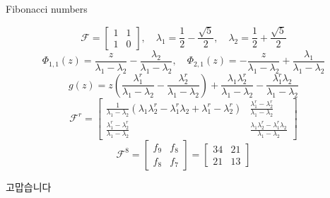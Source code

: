 \documentclass{beamer}
\begin{document}
\begin{frame}{Fibonacci numbers}

\begin{displaymath}
\mathcal{F} = \left[\begin{matrix}1 & 1\\1 & 0\end{matrix}\right],
\quad  \lambda_{1} =  \frac{1}{2}- \frac{\sqrt{5}}{2} ,
\quad \lambda_{2} = \frac{1}{2} + \frac{\sqrt{5}}{2}
\end{displaymath}
\vfill
\begin{displaymath}
 \Phi_{ 1, 1 }{\left (z \right )} = \frac{z}{\lambda_{1} - \lambda_{2}} - \frac{\lambda_{2}}{\lambda_{1} - \lambda_{2}}, \quad  \Phi_{ 2, 1 }{\left (z \right )} = - \frac{z}{\lambda_{1} - \lambda_{2}} + \frac{\lambda_{1}}{\lambda_{1} - \lambda_{2}}
\end{displaymath}
\vfill
\begin{displaymath}
g{\left (z \right )} = z \left(\frac{\lambda_{1}^{r}}{\lambda_{1} - \lambda_{2}} - \frac{\lambda_{2}^{r}}{\lambda_{1} - \lambda_{2}}\right) + \frac{\lambda_{1} \lambda_{2}^{r}}{\lambda_{1} - \lambda_{2}} - \frac{\lambda_{1}^{r} \lambda_{2}}{\lambda_{1} - \lambda_{2}}
\end{displaymath}
\vfill
\begin{displaymath}
\mathcal{F}^{r}=\left[\begin{matrix}\frac{1}{\lambda_{1} - \lambda_{2}} \left(\lambda_{1} \lambda_{2}^{r} - \lambda_{1}^{r} \lambda_{2} + \lambda_{1}^{r} - \lambda_{2}^{r}\right) & \frac{\lambda_{1}^{r} - \lambda_{2}^{r}}{\lambda_{1} - \lambda_{2}}\\\frac{\lambda_{1}^{r} - \lambda_{2}^{r}}{\lambda_{1} - \lambda_{2}} & \frac{\lambda_{1} \lambda_{2}^{r} - \lambda_{1}^{r} \lambda_{2}}{\lambda_{1} - \lambda_{2}}\end{matrix}\right]
\end{displaymath}
\vfill
\begin{displaymath}
\mathcal{F}^{8} = \left[\begin{matrix}f_{9} & f_{8}\\f_{8} & f_{7}\end{matrix}\right] = \left[\begin{matrix}34 & 21\\21 & 13\end{matrix}\right]
\end{displaymath}

\end{frame}


  

\begin{frame}{ }
\begin{CJK}{UTF8}{mj}
\Huge 고맙습니다
\end{CJK}
\end{frame}
\end{document}
